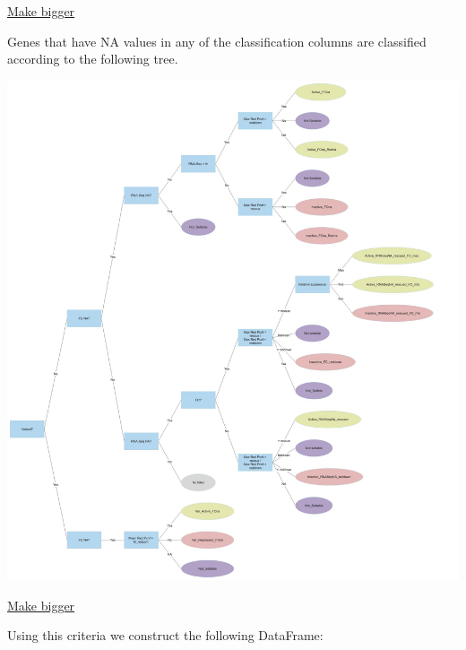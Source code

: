 \documentclass[11pt]{article}
\begin{document}
\href{./Plots/active\_genes\_tree.jpg}{Make bigger}


Genes that have NA values in any of the classification columns are classified according to the following tree.
\begin{center}
\includegraphics[width=.9\linewidth]{Plots/active_genes_NAs_2.jpg}
\end{center}

\href{Plots/active\_genes\_NAs\_2.jpg}{Make bigger}

Using this criteria we construct the following DataFrame:
\end{document}
